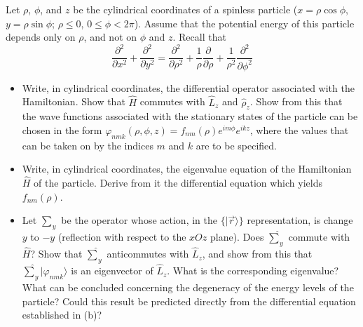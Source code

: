 \documentclass[10pt,a4paper]{article}
\newenvironment{problem}[2][Problem]{\begin{trivlist}
\item[\hskip \labelsep {\bfseries #1}\hskip \labelsep {\bfseries #2.}]}{\end{trivlist}}
\begin{document}
\begin{problem}{4}
[C-T Exercise 7-1] Let $\rho$, $\phi$, and $z$ be the cylindrical coordinates of a spinless particle ($x=\rho\cos\phi$, $y=\rho\sin\phi$; $\rho\leq0$, $0\leq\phi<2\pi$). Assume that the potential energy of this particle depends only on $\rho$, and not on $\phi$ and $z$. Recall that
\[
\frac{\partial^2}{\partial x^2}+\frac{\partial^2}{\partial y^2}=\frac{\partial^2}{\partial\rho^2}+\frac{1}{\rho}\frac{\partial}{\partial\rho}+\frac{1}{\rho^2}\frac{\partial^2}{\partial\phi^2}
\]
\begin{itemize}
\item[(a)] Write, in cylindrical coordinates, the differential operator associated with the Hamiltonian. Show that $\hat{H}$ commutes with $\hat{L}_z$ and $\hat{\rho}_z$. Show from this that the wave functions associated with the stationary states of the particle can be chosen in the form $\varphi_{nmk}(\rho,\phi,z)=f_{nm}(\rho)e^{im\phi}e^{ikz}$, where the values that can be taken on by the indices $m$ and $k$ are to be specified.
\item[(b)] Write, in cylindrical coordinates, the eigenvalue equation of the Hamiltonian $\hat{H}$ of the particle. Derive from it the differential equation which yields $f_{nm}(\rho)$.
\item[(c)] Let $\hat{\sum}_y$ be the operator whose action, in the $\{|\vec{r}\rangle\}$ representation, is change $y$ to $-y$ (reflection with respect to the $xOz$ plane). Does $\hat{\sum}_y$ commute with $\hat{H}$? Show that $\hat{\sum}_y$ anticommutes with $\hat{L}_z$, and show from this that $\hat{\sum}_y|\varphi_{nmk}\rangle$ is an eigenvector of $\hat{L}_z$. What is the corresponding eigenvalue? What can be concluded concerning the degeneracy of the energy levels of the particle? Could this result be predicted directly from the differential equation established in (b)?
\end{itemize}
\end{problem}
\end{document}
